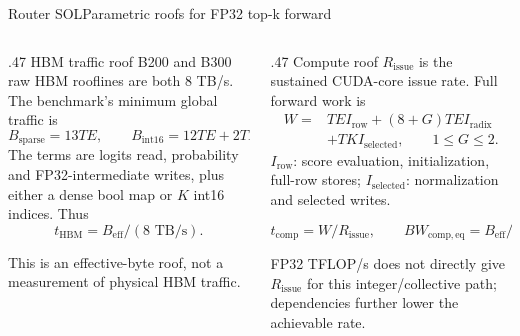 \documentclass[aspectratio=169,10pt]{beamer}
\renewcommand{\NvidiaSource}[1]{}
\begin{document}
\begin{frame}{Router SOL}{Parametric roofs for FP32 top-k forward}
  \NvidiaSource{\href{https://www.nvidia.com/en-us/data-center/hgx/}{NVIDIA HGX B300 specs};
    \texttt{TE/.../fused\_router/utils.h}}
  \begin{columns}[T,onlytextwidth]
    \begin{column}{.47\textwidth}
      {\NvidiaSansMedium HBM traffic roof}\NvidiaTightRule{.6pt}\vspace{.08in}
      \small B200 and B300 raw HBM rooflines are both 8 TB/s. The benchmark's minimum
      global traffic is
      \[
        B_{\mathrm{sparse}}=13TE,
        \qquad B_{\mathrm{int16}}=12TE+2TK.
      \]
      \small The terms are logits read, probability and FP32-intermediate writes, plus either
      a dense bool map or $K$ int16 indices. Thus
      \[
        t_{\mathrm{HBM}}=B_{\mathrm{eff}}/(8\text{ TB/s}).
      \]
      \vspace{.025in}
      {\scriptsize\color{NvidiaGray}\setlength{\baselineskip}{8.5pt}\selectfont
        This is an effective-byte roof, not a measurement of physical HBM traffic.\par}
    \end{column}
    \begin{column}{.47\textwidth}
      {\NvidiaSansMedium Compute roof}\NvidiaTightRule{.6pt}\vspace{.08in}
      \small $R_{\mathrm{issue}}$ is the sustained CUDA-core issue rate. Full forward work is
      {\footnotesize
      \[
        \begin{aligned}
          W={}&TEI_{\mathrm{row}}+(8+G)TEI_{\mathrm{radix}}\\[-2pt]
             &+TKI_{\mathrm{selected}},\qquad 1\leq G\leq2.
        \end{aligned}
      \]}
      \scriptsize $I_{\mathrm{row}}$: score evaluation, initialization, full-row stores;
      $I_{\mathrm{selected}}$: normalization and selected writes.\par
      \vspace{.01in}
      \[
        t_{\mathrm{comp}}=W/R_{\mathrm{issue}},\qquad
        BW_{\mathrm{comp,eq}}=B_{\mathrm{eff}}/t_{\mathrm{comp}}.
      \]
      \vspace{.025in}
      {\scriptsize\color{NvidiaGray}\setlength{\baselineskip}{8.5pt}\selectfont
        FP32 TFLOP/s does not directly give $R_{\mathrm{issue}}$ for this integer/collective path;
        dependencies further lower the achievable rate.\par}
    \end{column}
  \end{columns}
\end{frame}
\end{document}
